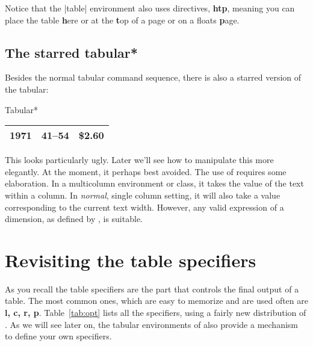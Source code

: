 Notice that the |table| environment also uses directives, \textbf{htp}, meaning you can place the table \textbf{h}ere or at the \textbf{t}op of a page or on a floats \textbf{p}age.

\clearpage


\subsection{The starred tabular*}

Besides the normal tabular command sequence, there is also a 
starred version of the tabular:

\begin{texexample}{Tabular*}{}
\begin{tabular*}{\linewidth}{|r|c|c|}
\hline
1971 & 41--54 & \$2.60 \\
\hline
\end{tabular*}
\end{texexample}

This looks particularly ugly. Later we'll see how to manipulate
this more elegantly. At the moment, it perhaps best
avoided. The use of \cmd{\linewidth} requires some elaboration.
In a multicolumn environment or class, it takes the value of
the text within a column. In \emph{normal}, single column setting,
it will also take a value corresponding to the current text
width. However, any valid expression of a dimension, as defined by \tex, is suitable.

\section{Revisiting the table specifiers}

As you recall the table specifiers are the part that controls the final output of a table. The most common ones, which are easy to memorize and are used often are \textbf{l, c, r, p}. Table~\ref{tab:opt} lists all the specifiers, using a fairly new distribution of \latexe. As we will see later on, the tabular environments of \latexe also provide a mechanism to define your own specifiers.  

